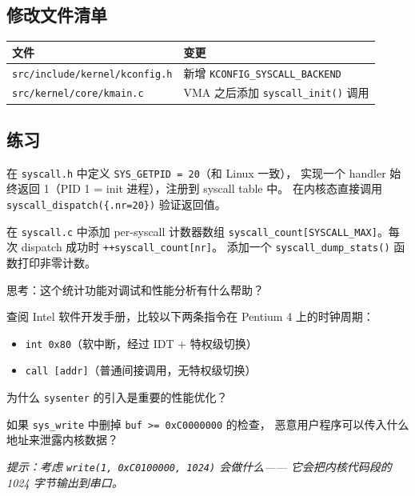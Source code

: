 \subsection{修改文件清单}

\begin{center}
\begin{tabular}{ll}
\toprule
\textbf{文件} & \textbf{变更} \\
\midrule
\texttt{src/include/kernel/kconfig.h} & 新增 \texttt{KCONFIG\_SYSCALL\_BACKEND} \\
\texttt{src/kernel/core/kmain.c}      & VMA 之后添加 \texttt{syscall\_init()} 调用 \\
\bottomrule
\end{tabular}
\end{center}

\subsection{练习}

\begin{exercise}[title={练习 1：添加 \texttt{sys\_getpid} 占位}]
在 \texttt{syscall.h} 中定义 \texttt{SYS\_GETPID = 20}（和 Linux 一致），
实现一个 handler 始终返回 1（PID 1 = init 进程），注册到 syscall table 中。
在内核态直接调用 \texttt{syscall\_dispatch(\{.nr=20\})} 验证返回值。
\end{exercise}

\begin{exercise}[title={练习 2：统计 syscall 调用次数}]
在 \texttt{syscall.c} 中添加 per-syscall 计数器数组
\texttt{syscall\_count[SYSCALL\_MAX]}。每次 dispatch 成功时 \texttt{++syscall\_count[nr]}。
添加一个 \texttt{syscall\_dump\_stats()} 函数打印非零计数。

思考：这个统计功能对调试和性能分析有什么帮助？
\end{exercise}

\begin{exercise}[title={练习 3：对比 \texttt{int 0x80} 与 \texttt{call} 的开销}]
查阅 Intel 软件开发手册，比较以下两条指令在 Pentium 4 上的时钟周期：
\begin{itemize}
  \item \texttt{int 0x80}（软中断，经过 IDT + 特权级切换）
  \item \texttt{call [addr]}（普通间接调用，无特权级切换）
\end{itemize}
为什么 \texttt{sysenter} 的引入是重要的性能优化？
\end{exercise}

\begin{exercise}[title={练习 4：安全漏洞分析}]
如果 \texttt{sys\_write} 中删掉 \texttt{buf >= 0xC0000000} 的检查，
恶意用户程序可以传入什么地址来泄露内核数据？

\emph{提示：考虑 \texttt{write(1, 0xC0100000, 1024)} 会做什么——
它会把内核代码段的 1024 字节输出到串口。}
\end{exercise}
